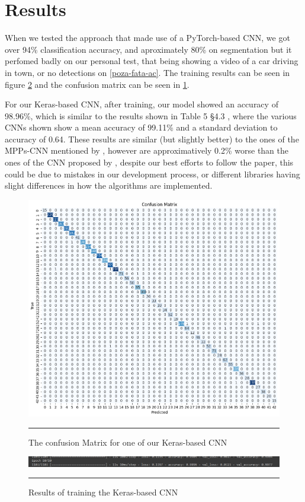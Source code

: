 \documentclass[conference]{IEEEtran}
\begin{document}
\section{Results}

When we tested the approach that made use of a PyTorch-based CNN, we got over 94\% classification accuracy, and aproximately 80\%
on segmentation but it perfomed badly on our personal test, that being showing a video of
a car driving in town, or no detections on \ref{poza-fata-ac}. The training results can be seen in figure \ref{img:results} and
the confusion matrix can be seen in \ref{img:confusion}.

For our Keras-based CNN, after training, our model showed an accuracy of 98.96\%, which is similar to the results shown in
Table 5 \S 4.3 \cite{svm_paper}, where the various CNNs shown show a mean accuracy of 99.11\% and a standard deviation to accuracy
of 0.64. These results are similar (but slightly better) to the ones of the MPPs-CNN mentioned by \cite{7603237}, however are approximatively 0.2\% worse
than the ones of the CNN proposed by \cite{svm_paper}, despite our best efforts to follow the paper, this could be due to mistakes
in our development process, or different libraries having slight differences in how the algorithms are implemented.

\begin{figure}
    \includegraphics[width=0.8\linewidth,]{Keras-Confusion-Matrix}
    \centering
    \label{img:confusion}
    \caption{The confusion Matrix for one of our Keras-based CNN}
    \noindent\rule{\textwidth}{1pt}
\end{figure}

\begin{figure}
    \includegraphics[width=\linewidth,]{Keras-Training-Results}
    \centering
    \label{img:results}
    \caption{Results of training the Keras-based CNN}
    \noindent\rule{\textwidth}{1pt}
\end{figure}
\end{document}
